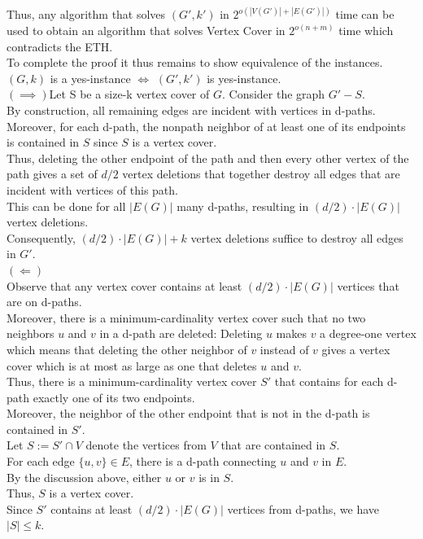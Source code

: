 \documentclass[11pt]{exam}
\begin{document}
\begin{questions}
\begin{solution}
    Thus, any algorithm that solves $(G', k')$ in $2^{o(|V (G')|+|E(G')|)}$ time can be used to obtain an algorithm that solves Vertex Cover in $2^{o(n+m)}$ time which contradicts the ETH.\\
    To complete the proof it thus remains to show equivalence of the instances.\\
    $(G, k)$ is a yes-instance $\Leftrightarrow$ $(G', k')$ is yes-instance.\\
    
    $(\implies)$Let S be a size-k vertex cover of $G$. Consider the graph $G'-S$.\\
    By construction, all remaining edges are incident with vertices in d-paths. \\
    Moreover, for each d-path, the nonpath neighbor of at least one of its endpoints is contained in $S$ since $S$ is a vertex cover.\\
    Thus, deleting the other endpoint of the path and then every other vertex of the path gives a set of $d/2$ vertex deletions that together destroy all edges that are incident with vertices of this path. \\
    This can be done for all $|E(G)|$ many d-paths, resulting in $(d/2) \cdot |E(G)|$ vertex deletions.\\
    Consequently, $(d/2) · |E(G)| + k$ vertex deletions suffice to destroy all edges in $G'$.\\
    $(\Leftarrow)$\\
    Observe that any vertex cover contains at least $(d/2) · |E(G)|$ vertices that are on d-paths.\\
    Moreover, there is a minimum-cardinality vertex cover such that no two neighbors $u$ and $v$ in a d-path are deleted: Deleting $u$ makes $v$ a degree-one vertex which means that deleting the other neighbor of $v$ instead of $v$ gives a vertex cover which is at most as large as one that deletes $u$ and $v$.\\
    Thus, there is a minimum-cardinality vertex cover $S'$ that contains for each d-path exactly one of its two endpoints.\\
    Moreover, the neighbor of the other endpoint that is not in the d-path is contained in $S'$.\\
    Let $S := S' \cap V$ denote the vertices from $V$ that are contained in $S$.\\
    For each edge $\{u,v\} \in E$, there is a d-path connecting $u$ and $v$ in $E$.\\
    By the discussion above, either $u$ or $v$ is in $S$.\\
    Thus, $S$ is a vertex cover.\\
    Since $S'$ contains at least $(d/2) \cdot |E(G)|$ vertices from d-paths, we have $|S|\leq k$.
\end{solution}


\end{questions}
\end{document}
